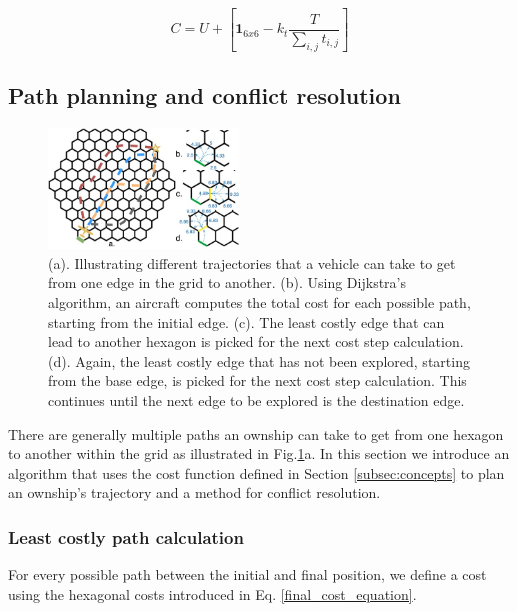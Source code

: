 \documentclass[conference, letter]{IEEEtran}
\begin{document}
\begin{equation}
    \label{final_cost_equation}
    C = U
 +  \left[
\textbf{1}_{6x6} - k_t\frac{T}{\sum_{i, j}t_{i, j}}
\right]
\end{equation}
 

\subsection{Path planning and conflict resolution} \label{subsec:strategy}

\begin{figure}[hbt!]
\centering
\includegraphics[width=0.45\textwidth]{multiple_several_paths.jpg}
\caption{(a). Illustrating different trajectories that a vehicle can take to get from one edge in the grid to another. (b). Using Dijkstra's algorithm, an aircraft computes the total cost for each possible path, starting from the initial edge. (c). The least costly edge that can lead to another hexagon is picked for the next cost step calculation. (d). Again, the least costly edge that has not been explored, starting from the base edge, is picked for the next cost step calculation. This continues until the next edge to be explored is the destination edge.} 
\label{severalpaths}
\end{figure}
There are generally multiple paths an ownship can take to get from one hexagon to another within the grid as illustrated in Fig.\ref{severalpaths}a. In this section we introduce an algorithm that uses the cost function defined in Section \ref{subsec:concepts} to plan an ownship's trajectory and a method for conflict resolution.

\subsubsection*{Least costly path calculation}
For every possible path between the initial and final position, we define a cost using the hexagonal costs introduced in Eq. \ref{final_cost_equation}. 


\end{document}
